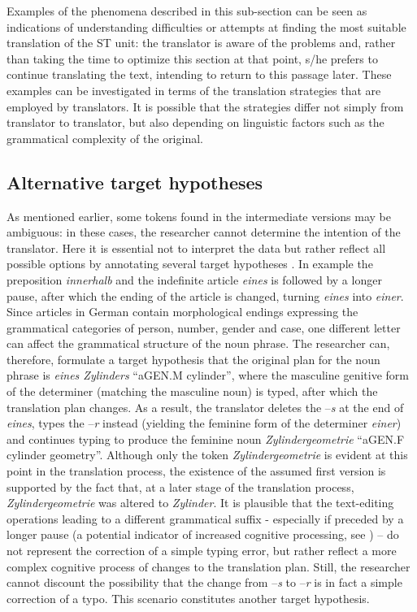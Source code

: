 \documentclass[output=paper]{LSP/langsci}
\begin{document}
Examples of the phenomena described in this sub-section can be seen as indications of understanding difficulties or attempts at finding the most suitable translation of the ST unit: the translator is aware of the problems and, rather than taking the time to optimize this section at that point, s/he prefers to continue translating the text, intending to return to this passage later. These examples can be investigated in terms of the translation strategies that are employed by translators. It is possible that the strategies differ not simply from translator to translator, but also depending on linguistic factors such as the grammatical complexity of the original.

\subsection{Alternative target hypotheses}
As mentioned earlier, some tokens found in the intermediate versions may be ambiguous: in these cases, the researcher cannot determine the intention of the translator. Here it is essential not to interpret the data but rather reflect all possible options by annotating several target hypotheses \citep{Lüdeling2008}. In example  the preposition \textit{innerhalb} and the indefinite article \textit{eines} is followed by a longer pause, after which the ending of the article is changed, turning \textit{eines} into \textit{einer}. Since articles in German contain morphological endings expressing the grammatical categories of person, number, gender and case, one different letter can affect the grammatical structure of the noun phrase. The researcher can, therefore, formulate a target hypothesis that the original plan for the noun phrase is \textit{eines Zylinders} “a{\tiny GEN.M} cylinder”, where the masculine genitive form of the determiner (matching the masculine noun) is typed, after which the translation plan changes. As a result, the translator deletes the –\textit{s} at the end of \textit{eines}, types the –\textit{r} instead (yielding the feminine form of the determiner \textit{einer}) and continues typing to produce the feminine noun \textit{Zylindergeometrie} “a{\tiny GEN.F} cylinder geometry”. Although only the token \textit{Zylindergeometrie} is evident at this point in the translation process, the existence of the assumed first version is supported by the fact that, at a later stage of the translation process, \textit{Zylindergeometrie} was altered to \textit{Zylinder}. It is plausible that the text-editing operations leading to a different grammatical suffix - especially if preceded by a longer pause (a potential indicator of increased cognitive processing, see \citealt{Dragsted2005}) – do not represent the correction of a simple typing error, but rather reflect a more complex cognitive process of changes to the translation plan. Still, the researcher cannot discount the possibility that the change from –\textit{s} to –\textit{r} is in fact a simple correction of a typo. This scenario constitutes another target hypothesis.
\end{document}
